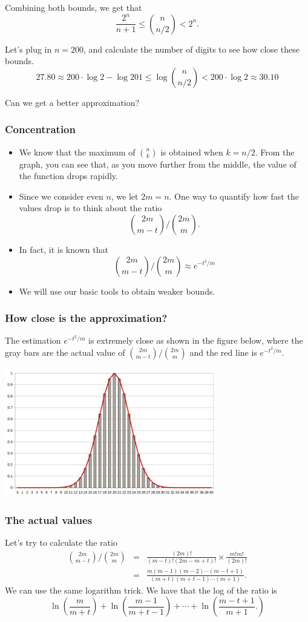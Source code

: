 \begin{frame}
  Combining both bounds, we get that
  \[\frac{2^n}{n+1}\leq \binom{n}{n/2} < 2^n.\]

  \pause Let's plug in $n=200$, and calculate the number of digits to
  see how close these bounds.
  \[27.80 \approx 200\cdot\log 2 - \log 201 \leq \log\binom{n}{n/2} < 200\cdot \log 2\approx 30.10\]
  \pause

  Can we get a better approximation?
\end{frame}

\begin{frame}\frametitle{Concentration}
  \begin{itemize}
  \item We know that the maximum of $\binom{n}{k}$ is obtained when
    $k=n/2$.  From the graph, you can see that, as you move further
    from the middle, the value of the function drops rapidly.
  \item Since we consider even $n$, we let $2m=n$.  One way to
    quantify how fast the values drop is to think about the ratio
    \[ \binom{2m}{m-t}\Big/\binom{2m}{m}. \] \pause
  \item In fact, it is known that
    \[ \binom{2m}{m-t}\Big/\binom{2m}{m} \approx e^{-t^2/m} \]
    \pause
  \item We will use our basic tools to obtain weaker bounds.
  \end{itemize}
\end{frame}

\begin{frame}\frametitle{How close is the approximation?}
  The estimation $e^{-t^2/m}$ is extremely close as shown in the
  figure below, where the gray bars are the actual value of
  $\binom{2m}{m-t}/\binom{2m}{m}$ and the red line is $e^{-t^2/m}$.

  \includegraphics[height=2.2in]{images/binom-approx.png}
\end{frame}

\begin{frame}\frametitle{The actual values}
  Let's try to calculate the ratio
  \begin{eqnarray*}
    \binom{2m}{m-t}\Big/\binom{2m}{m}
    &=&
    \frac{(2m)!}{(m-t)!(2m-m+t)!}\times\frac{m!m!}{(2m)!}\\
    &=&
    \frac{m(m-1)(m-2)\cdots(m-t+1)}{(m+t)(m+t-1)\cdots(m+1)}.
  \end{eqnarray*}
  \pause
  We can use the same logarithm trick.  We have that the log of the
  ratio is
  \[
  \ln\left(\frac{m}{m+t}\right) +
  \ln\left(\frac{m-1}{m+t-1}\right)+\cdots+
  \ln\left(\frac{m-t+1}{m+1}.\right)
  \]
\end{frame}
